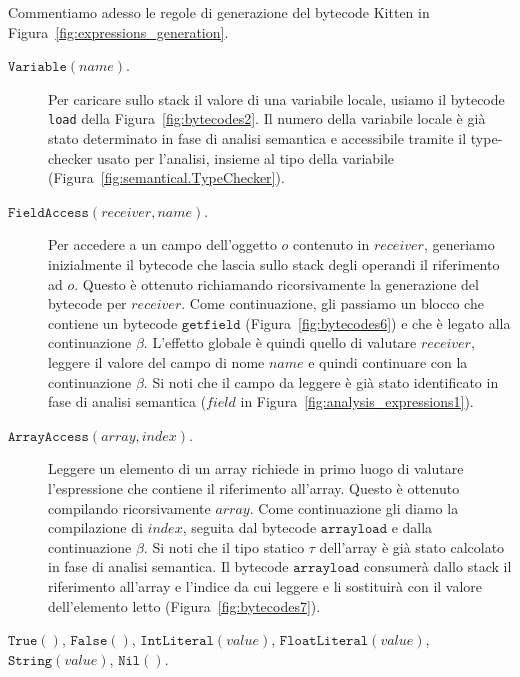 Commentiamo adesso le regole di generazione del bytecode Kitten in
Figura~\ref{fig:expressions_generation}.
%
\begin{description}
\item[\underline{$\mathtt{Variable(\mathit{name})}$}.]
  Per caricare sullo stack il valore di una variabile locale, usiamo
  il bytecode \texttt{load} della Figura~\ref{fig:bytecodes2}.
  Il numero della variabile locale \`e gi\`a stato determinato in
  fase di analisi semantica e accessibile tramite il type-checker usato
  per l'analisi, insieme al tipo della variabile
  (Figura~\ref{fig:semantical.TypeChecker}).
\item[\underline{$\mathtt{FieldAccess(\mathit{receiver},\mathit{name})}$}.]
  Per accedere a un campo dell'oggetto $o$
  contenuto in $\mathit{receiver}$,
  generiamo inizialmente il bytecode che lascia sullo stack degli operandi
  il riferimento ad $o$. Questo \`e ottenuto richiamando ricorsivamente
  la generazione del bytecode per $\mathit{receiver}$. Come continuazione,
  gli passiamo un blocco che contiene un bytecode
  $\mathtt{getfield}$ (Figura~\ref{fig:bytecodes6})
  e che \`e legato alla continuazione $\beta$.
  L'effetto globale \`e quindi quello di valutare $\mathit{receiver}$,
  leggere il valore del campo di nome $\mathit{name}$ e quindi continuare
  con la continuazione $\beta$. Si noti che il campo da leggere \`e gi\`a
  stato identificato in fase di analisi semantica ($\mathit{field}$ in
  Figura~\ref{fig:analysis_expressions1}).
\item[\underline{$\mathtt{ArrayAccess(\mathit{array},\mathit{index})}$}.]
  Leggere un elemento di un array richiede in primo luogo di
  valutare l'espressione che contiene il riferimento all'array. Questo \`e
  ottenuto compilando ricorsivamente $\mathit{array}$. Come continuazione
  gli diamo la compilazione di $\mathit{index}$, seguita dal bytecode
  $\mathtt{arrayload}$ e dalla
  continuazione $\beta$. Si noti che il tipo statico $\tau$
  dell'array \`e gi\`a stato calcolato in fase di analisi semantica.
  Il bytecode $\mathtt{arrayload}$ consumer\`a dallo stack
  il riferimento all'array e l'indice da cui leggere e li sostituir\`a
  con il valore dell'elemento letto (Figura~\ref{fig:bytecodes7}).
\item[\underline{$\mathtt{True()}$},
      \underline{$\mathtt{False()}$},
      \underline{$\mathtt{IntLiteral(\mathit{value})}$},
      \underline{$\mathtt{FloatLiteral(\mathit{value})}$},
      \underline{$\mathtt{String(\mathit{value})}$},
      \underline{$\mathtt{Nil()}$}.]

\end{description}
